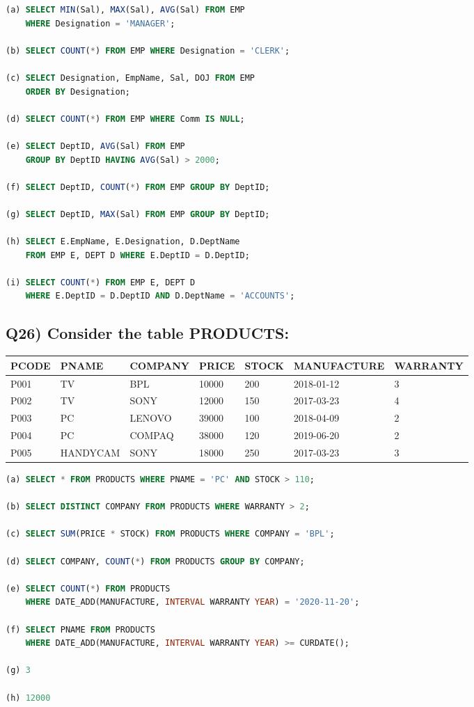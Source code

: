 \documentclass{article}
\begin{document}
\begin{lstlisting}[language=SQL]
(a) SELECT MIN(Sal), MAX(Sal), AVG(Sal) FROM EMP 
    WHERE Designation = 'MANAGER';

(b) SELECT COUNT(*) FROM EMP WHERE Designation = 'CLERK';

(c) SELECT Designation, EmpName, Sal, DOJ FROM EMP 
    ORDER BY Designation;

(d) SELECT COUNT(*) FROM EMP WHERE Comm IS NULL;

(e) SELECT DeptID, AVG(Sal) FROM EMP 
    GROUP BY DeptID HAVING AVG(Sal) > 2000;

(f) SELECT DeptID, COUNT(*) FROM EMP GROUP BY DeptID;

(g) SELECT DeptID, MAX(Sal) FROM EMP GROUP BY DeptID;

(h) SELECT E.EmpName, E.Designation, D.DeptName 
    FROM EMP E, DEPT D WHERE E.DeptID = D.DeptID;

(i) SELECT COUNT(*) FROM EMP E, DEPT D 
    WHERE E.DeptID = D.DeptID AND D.DeptName = 'ACCOUNTS';
\end{lstlisting}

\subsection*{Q26) Consider the table PRODUCTS:}

\begin{tabular}{|l|l|l|l|l|l|l|}
\hline
PCODE & PNAME & COMPANY & PRICE & STOCK & MANUFACTURE & WARRANTY \\
\hline
P001 & TV & BPL & 10000 & 200 & 2018-01-12 & 3 \\
P002 & TV & SONY & 12000 & 150 & 2017-03-23 & 4 \\
P003 & PC & LENOVO & 39000 & 100 & 2018-04-09 & 2 \\
P004 & PC & COMPAQ & 38000 & 120 & 2019-06-20 & 2 \\
P005 & HANDYCAM & SONY & 18000 & 250 & 2017-03-23 & 3 \\
\hline
\end{tabular}

\begin{lstlisting}[language=SQL]
(a) SELECT * FROM PRODUCTS WHERE PNAME = 'PC' AND STOCK > 110;

(b) SELECT DISTINCT COMPANY FROM PRODUCTS WHERE WARRANTY > 2;

(c) SELECT SUM(PRICE * STOCK) FROM PRODUCTS WHERE COMPANY = 'BPL';

(d) SELECT COMPANY, COUNT(*) FROM PRODUCTS GROUP BY COMPANY;

(e) SELECT COUNT(*) FROM PRODUCTS 
    WHERE DATE_ADD(MANUFACTURE, INTERVAL WARRANTY YEAR) = '2020-11-20';

(f) SELECT PNAME FROM PRODUCTS 
    WHERE DATE_ADD(MANUFACTURE, INTERVAL WARRANTY YEAR) >= CURDATE();

(g) 3

(h) 12000
\end{lstlisting}
\end{document}
